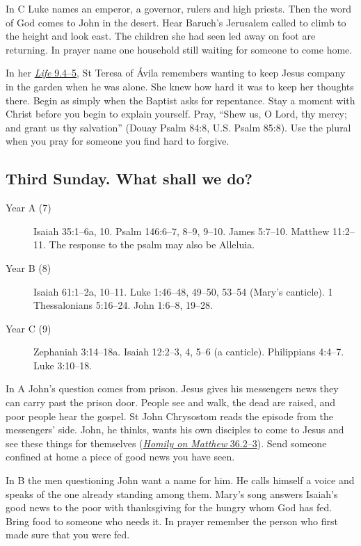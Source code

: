 In C Luke names an emperor, a governor, rulers and high priests. Then
the word of God comes to John in the desert. Hear Baruch's Jerusalem
called to climb to the height and look east. The children she had seen
led away on foot are returning. In prayer name one household still
waiting for someone to come home.

In her \href{https://ccel.org/ccel/teresa/life/life.viii.x.html}{\emph{Life} 9.4--5},
St Teresa of Ávila remembers wanting to keep Jesus company in the garden
when he was alone. She knew how hard it was to keep her thoughts there.
Begin as simply when the Baptist asks for repentance. Stay a moment with
Christ before you begin to explain yourself. Pray, “Shew us, O Lord,
thy mercy; and grant us thy salvation” (Douay Psalm 84:8, U.S. Psalm
85:8). Use the plural when you pray for someone you find hard to forgive.

\subsection{Third Sunday. What shall we do?}

\begin{description}
\item[Year A (7)] Isaiah 35:1--6a, 10. Psalm 146:6--7, 8--9, 9--10.
James 5:7--10. Matthew 11:2--11. The response to the psalm may also
be Alleluia.
\item[Year B (8)] Isaiah 61:1--2a, 10--11. Luke 1:46--48, 49--50, 53--54
(Mary's canticle). 1 Thessalonians 5:16--24. John 1:6--8, 19--28.
\item[Year C (9)] Zephaniah 3:14--18a. Isaiah 12:2--3, 4, 5--6
(a canticle). Philippians 4:4--7. Luke 3:10--18.
\end{description}

In A John's question comes from prison. Jesus gives his messengers news
they can carry past the prison door. People see and walk, the dead are
raised, and poor people hear the gospel. St John Chrysostom reads the
episode from the messengers' side. John, he thinks, wants his own
disciples to come to Jesus and see these things for themselves
(\href{https://www.newadvent.org/fathers/200136.htm}{\emph{Homily on Matthew} 36.2--3}).
Send someone confined at home a piece of good news you have seen.

In B the men questioning John want a name for him. He calls himself a
voice and speaks of the one already standing among them. Mary's song
answers Isaiah's good news to the poor with thanksgiving for the hungry
whom God has fed. Bring food to someone who needs it. In prayer remember
the person who first made sure that you were fed.

